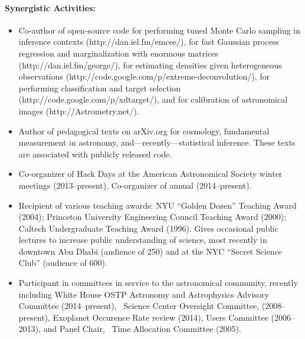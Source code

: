 \documentclass[letterpaper,12pt]{article}
\begin{document}
\paragraph{Synergistic Activities:}
\begin{itemize}\setlength{\itemsep}{0pt}
\item
Co-author of open-source code
for performing tuned Monte Carlo sampling in inference contexts (http://dan.iel.fm/emcee/),
for fast Gaussian process regression and marginalization with enormous matrices (http://dan.iel.fm/george/),
for estimating densities given heterogeneous observations (http://code.google.com/p/extreme-deconvolution/),
for performing classification and target selection (http://code.google.com/p/xdtarget/),
and
for calibration of astronomical images (http://Astrometry.net/).
\item
Author of pedagogical texts on arXiv.org for cosmology, fundamental
measurement in astronomy, and---recently---statistical inference.
These texts are associated with publicly released code.
\item
Co-organizer of Hack Days at the American Astronomical Society winter meetings (2013--present).
Co-organizer of annual  (2014--present).
\item
Recipient of various teaching awards: 
NYU ``Golden Dozen'' Teaching Award (2004);
Princeton University Engineering Council Teaching Award (2000);
Caltech Undergraduate Teaching Award (1996).
Gives occasional public lectures to increase public understanding of
science, most recently in downtown Abu Dhabi (audience of 250) and at
the NYC ``Secret Science Club'' (audience of 600).
\item
Participant in committees in service to the astronomical community,
recently including
White House OSTP Astronomy and Astrophysics Advisory Committee (2014--present),
\Spitzer\ Science Center Oversight Committee, (2008--present),
 Exoplanet Occurence Rate review (2014),
 Users Committee (2006--2013),
and
Panel Chair, \Spitzer\ Time Allocation Committee (2005).
\end{itemize}
\end{document}
